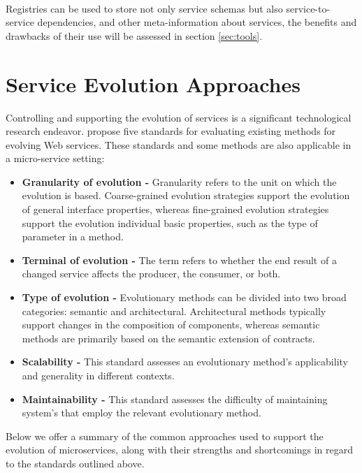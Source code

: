 \paragraph{}

Registries can be used to store not only service schemas but also service-to-service dependencies, and other meta-information about services, the benefits and drawbacks of their use will be
assessed in section \ref{sec:tools}.

\section{Service Evolution Approaches} %
\label{sec:service_evolution_approaches}

Controlling and supporting the evolution of services is a significant technological research endeavor.
\citeauthor{webServiceEvolution} \cite{webServiceEvolution} propose five standards for evaluating existing methods for evolving Web services.
These standards and some methods are also applicable in a micro-service setting:

\begin{itemize}
    \item \textbf{Granularity of evolution -} Granularity refers to the unit on which the evolution is based.
    Coarse-grained evolution strategies support the evolution of general interface properties,
    whereas fine-grained evolution strategies support the evolution individual basic properties, such as the type of parameter in a method.
    \item \textbf{Terminal of evolution -} The term refers to whether the end result of a changed service affects the producer, the consumer, or both.
    \item \textbf{Type of evolution -} Evolutionary methods can be divided into two broad categories: semantic and architectural.
    Architectural methods typically support changes in the composition of components, whereas semantic methods are primarily based on the semantic extension of contracts.
    \item \textbf{Scalability -} This standard assesses an evolutionary method's applicability and generality in different contexts.
    \item \textbf{Maintainability -} This standard assesses the difficulty of maintaining system's that employ the relevant evolutionary method.
\end{itemize}

Below we offer a summary of the common approaches used to support the evolution of microservices,
along with their strengths and shortcomings in regard to the standards outlined above.

